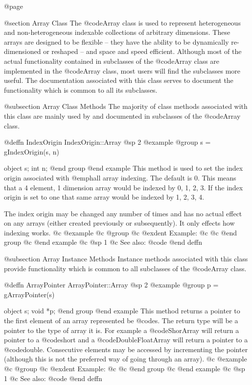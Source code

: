@page

@section Array Class
The @code{Array} class is used to represent heterogeneous and
non-heterogeneous indexable collections of arbitrary dimensions.  These
arrays are designed to be flexible -- they have the ability to be
dynamically re-dimensioned or reshaped -- and space and speed efficient.
Although most of the actual functionality contained in subclasses of the
@code{Array} class are implemented in the @code{Array} class, most users
will find the subclasses more useful.  The documentation associated with
this class serves to document the functionality which is common to all
its subclasses.



@subsection Array Class Methods
The majority of class methods associated with this class are mainly used
by and documented in subclasses of the @code{Array} class.





@deffn {IndexOrigin} IndexOrigin::Array
@sp 2
@example
@group
s = gIndexOrigin(s, n)

object  s;
int     n;
@end group
@end example
This method is used to set the index origin associated with @emph{all}
array indexing.  The default is 0.  This means that a 4 element, 1
dimension array would be indexed by 0, 1, 2, 3.  If the index origin
is set to one that same array would be indexed by 1, 2, 3, 4.

The index origin may be changed any number of times and has no actual effect
on any arrays (either created previously or subsequently).  It only
effects how indexing works.
@c @example
@c @group
@c @exdent Example:
@c 
@c @end group
@c @end example
@c @sp 1
@c See also:  @code{}
@end deffn






@subsection Array Instance Methods
Instance methods associated with this class provide functionality which
is common to all subclasses of the @code{Array} class.








@deffn {ArrayPointer} ArrayPointer::Array
@sp 2
@example
@group
p = gArrayPointer(s)

object  s;
void    *p;
@end group
@end example
This method returns a pointer to the first element of an array represented
be @code{s}.  The return type will be a pointer to the type of array it
is.  For example a @code{ShorArray} will return a pointer to a @code{short}
and a @code{DoubleFloatArray} will return a pointer to a @code{double}.
Consecutive elements may be accessed by incrementing the pointer (although
this is not the preferred way of going through an array).
@c @example
@c @group
@c @exdent Example:
@c 
@c @end group
@c @end example
@c @sp 1
@c See also:  @code{}
@end deffn









